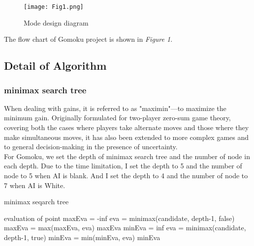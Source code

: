 \documentclass[10pt,twocolumn,letterpaper]{article}
\begin{document}
\begin{figure}[H]
  \centering
  \texttt{[image: Fig1.png]}\\
  \caption{Mode design diagram
}\label{straddltimeScale}
\end{figure}

The flow chart of Gomoku project is shown in \emph{Figure 1}.

\subsection{Detail of Algorithm}

\subsubsection{minimax search tree}
When dealing with gains, it is referred to as "maximin"—to maximize the minimum gain. Originally formulated for two-player zero-sum game theory, covering both the cases where players take alternate moves and those where they make simultaneous moves, it has also been extended to more complex games and to general decision-making in the presence of uncertainty.\\

For Gomoku, we set the depth of minimax search tree and the number of node in each depth. Due to the time limitation, I set the depth to 5 and the number of node to 5 when AI is blank. And I set the depth to 4 and the number of node to 7 when AI is White.

\begin{algorithm}
  \caption{minimax seqarch tree}
  \begin{algorithmic}[1]
            \Return evaluation of point
        \EndIf
            \State maxEva = -inf
                \State eva = minimax(candidate, depth-1, false)
            \EndFor
            \State maxEva = max(maxEva, eva)
            \State \Return maxEva
        \Else
            \State minEva = inf
                \State eva = minimax(candidate, depth-1, true)
            \EndFor
            \State minEva = min(minEva, eva)
            \State \Return minEva
        \EndIf
    \EndFunction  
  \end{algorithmic}  
\end{algorithm}
\end{document}
